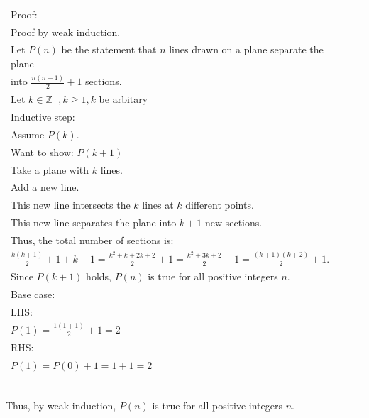 \documentclass[12pt]{exam}
\begin{document}
\begin{solution}
	\begin{tabular}{ll}
		Proof:                                                                                       \\
		Proof by weak induction.                                                                     \\
		Let $P(n)$ be the statement that $n$ lines drawn on a plane separate the plane               \\
		into $\frac{n(n+1)}{2}+1$ sections.                                                          \\
		Let $k\in \mathbb{Z}^+, k\ge 1, k$ be arbitary                                               \\
		Inductive step:                                                                              \\
		Assume $P(k)$.                                                                               \\
		Want to show: $P(k+1)$                                                                       \\
		Take a plane with $k$ lines.                                                                 \\
		Add a new line.                                                                              \\
		This new line intersects the $k$ lines at $k$ different points.                              \\
		This new line separates the plane into $k+1$ new sections.                                   \\
		Thus, the total number of sections is:                                                       \\
		$\frac{k(k+1)}{2}+1+k+1=\frac{k^2+k+2k+2}{2}+1=\frac{k^2+3k+2}{2}+1=\frac{(k+1)(k+2)}{2}+1$. \\
		Since $P(k+1)$ holds, $P(n)$ is true for all positive integers $n$.                          \\
		Base case:                                                                                   \\
		LHS:                                                                                         \\
		$P(1)=\frac{1(1+1)}{2}+1=2$                                                                  \\
		RHS:                                                                                         \\
		$P(1)=P(0)+1=1+1=2$                                                                          \\
	\end{tabular}
	\\Thus, by weak induction, $P(n)$ is true for all positive integers $n$.
\end{solution}
\end{document}
